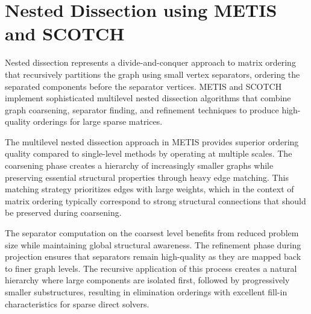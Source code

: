 \newpage

\section{Nested Dissection using METIS and SCOTCH}

Nested dissection represents a divide-and-conquer approach to matrix ordering that recursively partitions the graph using small vertex separators, ordering the separated components before the separator vertices. METIS and SCOTCH implement sophisticated multilevel nested dissection algorithms that combine graph coarsening, separator finding, and refinement techniques to produce high-quality orderings for large sparse matrices.

The multilevel nested dissection approach in METIS provides superior ordering quality compared to single-level methods by operating at multiple scales. The coarsening phase creates a hierarchy of increasingly smaller graphs while preserving essential structural properties through heavy edge matching. This matching strategy prioritizes edges with large weights, which in the context of matrix ordering typically correspond to strong structural connections that should be preserved during coarsening.

The separator computation on the coarsest level benefits from reduced problem size while maintaining global structural awareness. The refinement phase during projection ensures that separators remain high-quality as they are mapped back to finer graph levels. The recursive application of this process creates a natural hierarchy where large components are isolated first, followed by progressively smaller substructures, resulting in elimination orderings with excellent fill-in characteristics for sparse direct solvers.

    
    
    
    
